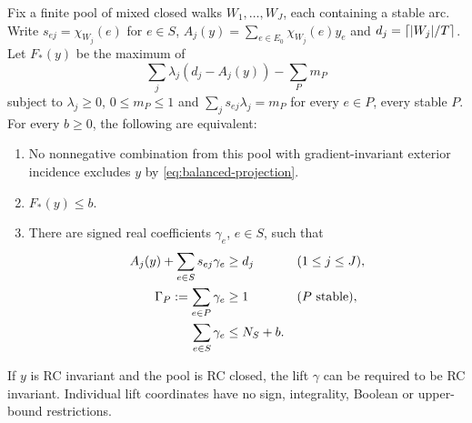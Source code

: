 \begin{theorem}\label{thm:finite-pool-closure}
Fix a finite pool of mixed closed walks $W_1,\ldots,W_J$, each containing a
stable arc. Write $s_{ej}=\chi_{W_j}(e)$ for $e\in S$,
$A_j(y)=\sum_{e\in E_0}\chi_{W_j}(e)y_e$ and $d_j=\left\lceil|W_j|/T\right\rceil$.
Let $F_*(y)$ be the maximum of
\begin{equation}
 \sum_j\lambda_j(d_j-A_j(y))-\sum_Pm_P\label{eq:pool-primal}
\end{equation}
subject to $\lambda_j\ge0$, $0\le m_P\le1$ and
$\sum_js_{ej}\lambda_j=m_P$ for every $e\in P$, every stable $P$.
For every $b\ge0$, the following are equivalent:
\begin{enumerate}
\item No nonnegative combination from this pool with gradient-invariant
exterior incidence excludes $y$ by \eqref{eq:balanced-projection}.
\item $F_*(y)\le b$.
\item There are signed real coefficients $\gamma_e$, $e\in S$, such that
\begin{align}
 A_j(y)+\sum_{e\in S}s_{ej}\gamma_e&\ge d_j &&(1\le j\le J),\label{eq:pool-extension}\\
 \Gamma_P:=\sum_{e\in P}\gamma_e&\ge1 &&(P\text{ stable}),\notag\\
 \sum_{e\in S}\gamma_e&\le N_S+b.\notag
\end{align}
\end{enumerate}
If $y$ is RC invariant and the pool is RC closed, the lift $\gamma$ can be
required to be RC invariant. Individual lift coordinates have no sign,
integrality, Boolean or upper-bound restrictions.
\end{theorem}

